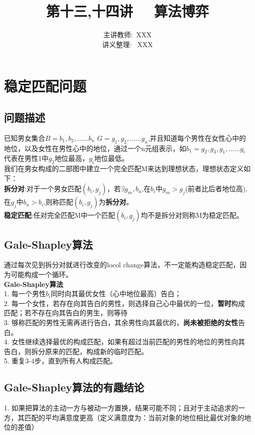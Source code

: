 \documentclass[11pt]{ctexart}
\title{\Huge 第十三,十四讲  \ \ 算法博弈}
\author{主讲教师:\  XXX
\\ 讲义整理: \ XXX}
\begin{document}
\maketitle

\section{稳定匹配问题}

\subsection{问题描述}
已知男女集合$B={b_1,b_2,……b_n}$ $G={g_1,g_2,……g_n}$,并且知道每个男性在女性心中的地位，以及女性在男性心中的地位，通过一个n元组表示，如$b_1={g_2,g_3,g_1,……g_i}$代表在男性1中$g_2$地位最高，$g_i$地位最低。\\

我们在男女构成的二部图中建立一个完全匹配M来达到理想状态，理想状态定义如下：\\

\textbf{拆分对}:对于一个男女匹配$(b_i,g_j)$，若$\exists{g_m,b_n}$,在$b_i$中$g_m > g_j$(前者比后者地位高),在$g_j$中$b_n>b_i$,则称匹配$(b_i,g_j)$为\textbf{拆分对}。\\

\textbf{稳定匹配}:任对完全匹配M中一个匹配$(b_i,g_j)$均不是拆分对则称M为稳定匹配。

\subsection{Gale-Shapley算法}
通过每次见到拆分对就进行改变的locol change算法，不一定能构造稳定匹配，因为可能构成一个循环。\\

\textbf{Gale-Shapley算法}\\
1. 每一个男性$b_i$同时向其最优女性（心中地位最高）告白；\\
2. 每一个女性，若存在向其告白的男性，则选择自己心中最优的一位，\textbf{暂时}构成匹配；若不存在向其告白的男生，则等待\\
3. 够称匹配的男性无需再进行告白，其余男性向其最优的，\textbf{尚未被拒绝的女性}告白。\\
4. 女性继续选择最优的构成匹配，如果有超过当前匹配的男性的地位的男性向其告白，则拆分原来的匹配，构成新的临时匹配。\\
5. 重复3-4步，直到所有人构成匹配。\\

\subsection{Gale-Shapley算法的有趣结论}
1. 如果把算法的主动一方与被动一方置换，结果可能不同；且对于主动追求的一方，其匹配的平均满意度更高（定义满意度为：当前对象的地位相比最优对象的地位的差值）\\
\end{document}
